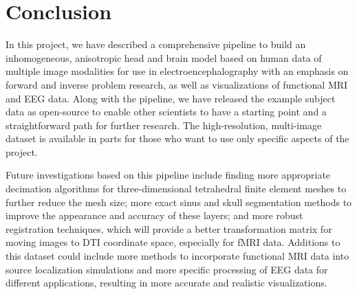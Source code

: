 %
%

\section{Conclusion}
\label{sec:Conclusion}


In this project, we have described a comprehensive pipeline to build an inhomogeneous, anisotropic head and brain model based on human data of multiple image modalities for use in electroencephalography with an emphasis on forward and inverse problem research, as well as visualizations of functional MRI and EEG data. Along with the pipeline, we have released the example subject data as open-source to enable other scientists to have a starting point and a straightforward path for further research. The high-resolution, multi-image dataset is available in parts for those who want to use only specific aspects of the project.



Future investigations based on this pipeline include finding more appropriate decimation algorithms for three-dimensional tetrahedral finite element meshes to further reduce the mesh size; more exact sinus and skull segmentation methods to improve the appearance and accuracy of these layers; and more robust registration techniques, which will provide a better transformation matrix for moving images to DTI coordinate space, especially for fMRI data. Additions to this dataset could include more methods to incorporate functional MRI data into source localization simulations and more specific processing of EEG data for different applications, resulting in more accurate and realistic visualizations. 
